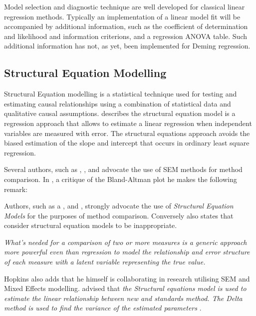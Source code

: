 \documentclass[12pt, a4paper]{report}
\theoremstyle{plain}
\theoremstyle{definition}
\theoremstyle{remark}
\begin{document}
	
	
	
	Model selection and diagnostic technique are well developed for classical linear regression methods. Typically an implementation of a linear model fit will be accompanied by additional information, such as the coefficient of determination and likelihood and information criterions, and a regression ANOVA table. Such additional information has not, as yet, been implemented for Deming regression.
	

	



	\subsection{Structural Equation Modelling}
	
	
	
	Structural Equation modelling is a statistical technique used for testing and estimating causal relationships using a combination of statistical data and qualitative causal assumptions. \citet{carrasco2004} describes the structural equation model is a regression approach that allows to estimate a linear 
	regression when independent variables are measured with error.
	The structural equations approach avoids the biased estimation of the slope and intercept that occurs in ordinary least square regression.
	
	
	Several authors, such as \citet{lewis}, \citet{gkelly1985},\citet{voelkel2005} and \citet{hopkins2004bias} advocate the use of SEM methods for method comparison. In \citet{hopkins2004bias}, a critique of the Bland-Altman plot he makes the following remark:
	
	Authors, such as a \citet{lewis}, \citet{dunnSEME} and \citet{voelkel2005}, strongly advocate the use of \textit{Structural Equation Models} for the purposes of method comparison. Conversely \citet{BA99} also states that consider structural equation models to be inappropriate.
	
	\emph{What's needed for a comparison of two or more measures is a
		generic approach more powerful even than regression to model the
		relationship and error structure of each measure with a latent
		variable representing the true value.}
	
	Hopkins also adds that he himself is collaborating in research utilising SEM and Mixed Effects modelling. \citet{gkelly1985} advised that \textit{the Structural equations model is used to estimate the linear relationship between new and standards method.
		The Delta method is used to find the variance of the estimated parameters} \citep{gkelly1985}.
	
\end{document}
